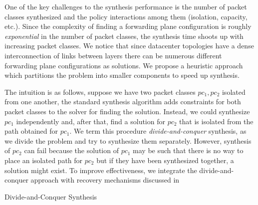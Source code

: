 One of the key challenges to the synthesis performance is the number
of packet classes synthesized and the policy interactions among them
(isolation, capacity, etc.). Since the complexity of finding a
forwarding plane configuration is roughly \emph{exponential} in the
number of packet classes, the synthesis time shoots up with increasing
packet classes. 
We notice that since datacenter topologies have a dense interconnection of
links between layers there can be
numerous different forwarding plane configurations as solutions.
We propose a heuristic approach which partitions the problem 
into smaller components to speed up synthesis.

The intuition is as follows, suppose we have two packet classes $pc_1,
pc_2$ isolated from one another, the standard synthesis algorithm adds 
constraints for both packet classes to the solver for finding the solution.
Instead, we could synthesize $pc_1$
independently and, after that, find a solution for $pc_2$ 
that is isolated from the
path obtained for $pc_1$. We term this
procedure \emph{divide-and-conquer} synthesis, as we divide
the problem and try to synthesize them separately.
However, synthesis of $pc_2$ can fail because the solution
of $pc_1$ may be such that there is no way to place an isolated path for
$pc_2$ but if they have been synthesized together, a
solution might exist. To improve effectiveness, we integrate the 
divide-and-conquer approach with recovery 
mechanisms discussed in 

\begin{algorithm}[h]
\begin{footnotesize}
	\caption{Divide-and-Conquer Synthesis}
	\label{dcsyn}
	\begin{algorithmic}[1]
		\Else
		  \EndIf
		  \EndIf
		\Else
		\EndIf
		\EndWhile
		\EndIf
		\EndProcedure
	\end{algorithmic}
\end{footnotesize}
\end{algorithm}



